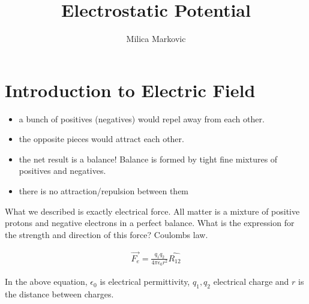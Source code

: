 \documentclass{ximera}
\title{Electrostatic Potential}
\author{Milica Markovic}
\begin{document}
  
\begin{abstract}  

\end{abstract}  
\maketitle    


\section{Introduction to Electric Field}


\begin{itemize}
\item a bunch of positives (negatives) would repel away from each other.
\item the opposite pieces would attract each other.
\item the net result is a balance! Balance is formed by tight fine mixtures of positives and negatives.
\item there is no attraction/repulsion between them
\end{itemize}
 

What we described is exactly electrical force. All matter is a mixture of positive protons and negative electrons in a perfect balance. What is the expression for the strength and direction of this force? Coulombs law.

\begin{eqnarray}
\vec{F_e}=\frac{q_1 q_2}{4 \pi \epsilon_0 r^2} \hat{R_{12}}
\end{eqnarray}\label{Coulombslaw}

In the above equation, $\epsilon_0$ is electrical permittivity, $q_1,q_2$ electrical charge and $r$ is the distance between charges.
\end{document}
